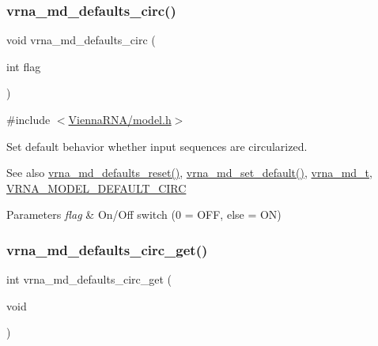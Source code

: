 \subsubsection{\texorpdfstring{vrna\+\_\+md\+\_\+defaults\+\_\+circ()}{vrna\_md\_defaults\_circ()}}
{\footnotesize\ttfamily void vrna\+\_\+md\+\_\+defaults\+\_\+circ (\begin{DoxyParamCaption}\item[{int}]{flag }\end{DoxyParamCaption})}



{\ttfamily \#include $<$\hyperlink{model_8h}{Vienna\+R\+N\+A/model.\+h}$>$}



Set default behavior whether input sequences are circularized. 

\begin{DoxySeeAlso}{See also}
\hyperlink{group__model__details_ga70834424cf804d149937de89f80ceb45}{vrna\+\_\+md\+\_\+defaults\+\_\+reset()}, \hyperlink{group__model__details_ga8ac6ff84936282436f822644bf841f66}{vrna\+\_\+md\+\_\+set\+\_\+default()}, \hyperlink{group__model__details_ga1f8a10e12a0a1915f2a4eff0b28ea17c}{vrna\+\_\+md\+\_\+t}, \hyperlink{group__model__details_ga22059033db7bcd875c51fec32425490a}{V\+R\+N\+A\+\_\+\+M\+O\+D\+E\+L\+\_\+\+D\+E\+F\+A\+U\+L\+T\+\_\+\+C\+I\+RC} 
\end{DoxySeeAlso}

\begin{DoxyParams}{Parameters}
{\em flag} & On/\+Off switch (0 = O\+FF, else = ON) \\
\hline
\end{DoxyParams}
\mbox{\label{group__model__details_gad3a7e58de344ad93a08925f58f94f6fb}} 
\subsubsection{\texorpdfstring{vrna\+\_\+md\+\_\+defaults\+\_\+circ\+\_\+get()}{vrna\_md\_defaults\_circ\_get()}}
{\footnotesize\ttfamily int vrna\+\_\+md\+\_\+defaults\+\_\+circ\+\_\+get (\begin{DoxyParamCaption}\item[{void}]{ }\end{DoxyParamCaption})}



